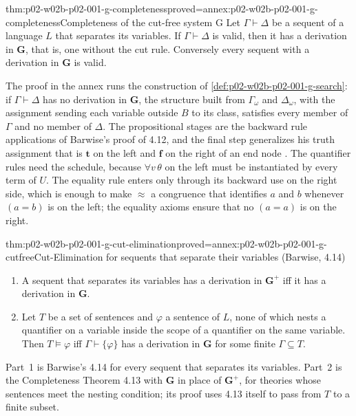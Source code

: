 \begin{hbtheorem}{thm:p02-w02b-p02-001-g-completeness}{proved=annex:p02-w02b-p02-001-g-completeness}{Completeness of the cut-free system G}
Let \(\Gamma\vdash\Delta\) be a sequent of a language \(L\) that separates
its variables.  If \(\Gamma\vdash\Delta\) is valid, then it has a derivation
in \(\mathbf G\), that is, one without the cut rule.  Conversely every
sequent with a derivation in \(\mathbf G\) is valid.
\end{hbtheorem}

The proof in the annex runs the construction of
\cref{def:p02-w02b-p02-001-g-search}: if \(\Gamma\vdash\Delta\) has no
derivation in \(\mathbf G\), the structure built from \(\Gamma_\omega\) and
\(\Delta_\omega\), with the assignment sending each variable outside \(B\) to
its class, satisfies every member of \(\Gamma\) and no member of \(\Delta\).
The propositional stages are the backward rule applications of Barwise's
proof of 4.12, and the final step generalizes his truth assignment that is
\(\mathbf t\) on the left and \(\mathbf f\) on the right of an end node
\cite[ch.~A.1, \S4, p.~38]{Barwise1977FirstOrder}.  The quantifier rules
need the schedule, because \(\forall v\,\theta\) on the left must be
instantiated by every term of \(U\).  The equality rule enters only through
its backward use on the right side, which is enough to make \(\approx\) a
congruence that identifies \(a\) and \(b\) whenever \((a=b)\) is on the left;
the equality axioms ensure that no \((a=a)\) is on the right.

\begin{hbcorollary}{thm:p02-w02b-p02-001-g-cut-elimination}{proved=annex:p02-w02b-p02-001-g-cutfree}{Cut-Elimination for sequents that separate their variables (Barwise, 4.14)}
\begin{enumerate}
\item A sequent that separates its variables has a derivation in
      \(\mathbf G^{+}\) iff it has a derivation in \(\mathbf G\).
\item Let \(T\) be a set of sentences and \(\varphi\) a sentence of \(L\),
      none of which nests a quantifier on a variable inside the scope of a
      quantifier on the same variable.  Then \(T\models\varphi\) iff
      \(\Gamma\vdash\{\varphi\}\) has a derivation in \(\mathbf G\) for some
      finite \(\Gamma\subseteq T\).
\end{enumerate}
\end{hbcorollary}

Part~1 is Barwise's 4.14 \cite[ch.~A.1, \S4, p.~40]{Barwise1977FirstOrder}
for every sequent that separates its variables.  Part~2 is the
Completeness Theorem 4.13 with \(\mathbf G\) in place of \(\mathbf G^{+}\),
for theories whose sentences meet the nesting condition; its proof uses
4.13 itself to pass from \(T\) to a finite subset.

